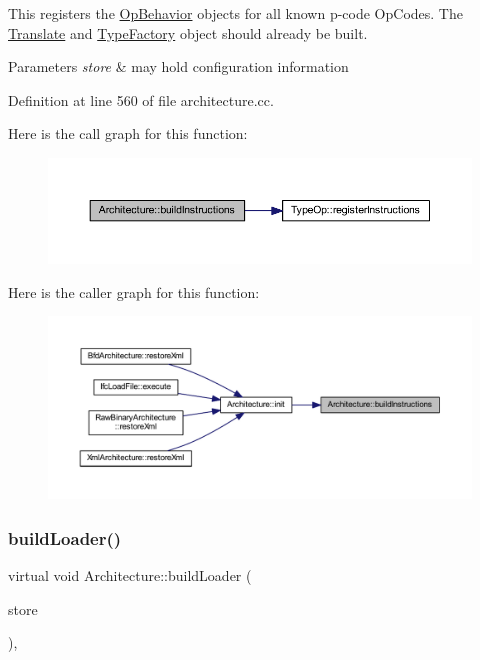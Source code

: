 This registers the \mbox{\hyperlink{class_op_behavior}{Op\+Behavior}} objects for all known p-\/code Op\+Codes. The \mbox{\hyperlink{class_translate}{Translate}} and \mbox{\hyperlink{class_type_factory}{Type\+Factory}} object should already be built. 
\begin{DoxyParams}{Parameters}
{\em store} & may hold configuration information \\
\hline
\end{DoxyParams}


Definition at line 560 of file architecture.\+cc.

Here is the call graph for this function\+:
\nopagebreak
\begin{figure}[H]
\begin{center}
\leavevmode
\includegraphics[width=350pt]{class_architecture_aa059c551a53018c8d70a1c2f9fc6ed73_cgraph}
\end{center}
\end{figure}
Here is the caller graph for this function\+:
\nopagebreak
\begin{figure}[H]
\begin{center}
\leavevmode
\includegraphics[width=350pt]{class_architecture_aa059c551a53018c8d70a1c2f9fc6ed73_icgraph}
\end{center}
\end{figure}
\mbox{\label{class_architecture_a9a19e1f07ba0449dfb21d3388b0dbc33}} 
\subsubsection{\texorpdfstring{buildLoader()}{buildLoader()}}
{\footnotesize\ttfamily virtual void Architecture\+::build\+Loader (\begin{DoxyParamCaption}\item[{\mbox{\hyperlink{class_document_storage}{Document\+Storage}} \&}]{store }\end{DoxyParamCaption})\hspace{0.3cm}{\ttfamily [protected]}, {}}



